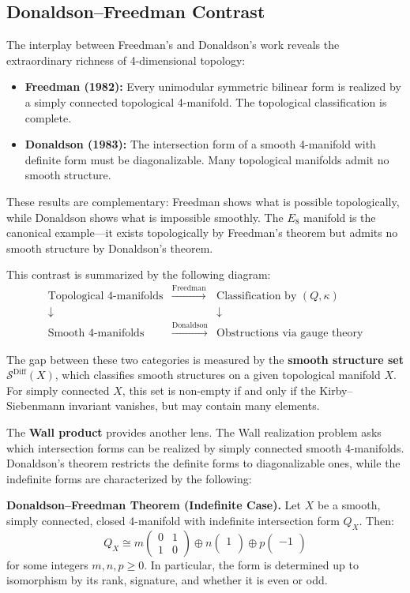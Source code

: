 \subsection*{Donaldson--Freedman Contrast}

The interplay between Freedman's and Donaldson's work reveals the extraordinary richness of 4-dimensional topology:

\begin{itemize}
    \item \textbf{Freedman (1982):} Every unimodular symmetric bilinear form is realized by a simply connected topological 4-manifold. The topological classification is complete.
    \item \textbf{Donaldson (1983):} The intersection form of a smooth 4-manifold with definite form must be diagonalizable. Many topological manifolds admit no smooth structure.
\end{itemize}

These results are complementary: Freedman shows what is possible topologically, while Donaldson shows what is impossible smoothly. The $E_8$ manifold is the canonical example---it exists topologically by Freedman's theorem but admits no smooth structure by Donaldson's theorem.

This contrast is summarized by the following diagram:
\[
\begin{array}{ccc}
\text{Topological 4-manifolds} & \xrightarrow{\text{Freedman}} & \text{Classification by } (Q, \kappa) \\
\downarrow & & \downarrow \\
\text{Smooth 4-manifolds} & \xrightarrow{\text{Donaldson}} & \text{Obstructions via gauge theory}
\end{array}
\]

The gap between these two categories is measured by the \textbf{smooth structure set} $\mathcal{S}^{\text{Diff}}(X)$, which classifies smooth structures on a given topological manifold $X$. For simply connected $X$, this set is non-empty if and only if the Kirby--Siebenmann invariant vanishes, but may contain many elements.

The \textbf{Wall product} provides another lens. The Wall realization problem asks which intersection forms can be realized by simply connected smooth 4-manifolds. Donaldson's theorem restricts the definite forms to diagonalizable ones, while the indefinite forms are characterized by the following:

\textbf{Donaldson--Freedman Theorem (Indefinite Case).} Let $X$ be a smooth, simply connected, closed 4-manifold with indefinite intersection form $Q_X$. Then:
\[
Q_X \cong m\begin{pmatrix} 0 & 1 \\ 1 & 0 \end{pmatrix} \oplus n\begin{pmatrix} 1 \\ \end{pmatrix} \oplus p\begin{pmatrix} -1 \\ \end{pmatrix}
\]
for some integers $m, n, p \geq 0$. In particular, the form is determined up to isomorphism by its rank, signature, and whether it is even or odd.

